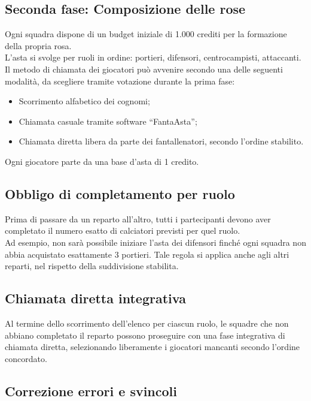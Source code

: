 \subsection{Seconda fase: Composizione delle rose}
\label{art:4.3.2}

Ogni squadra dispone di un budget iniziale di 1.000 crediti per la formazione della propria rosa.\\
L’asta si svolge per ruoli in ordine: portieri, difensori, centrocampisti, attaccanti.\\
Il metodo di chiamata dei giocatori può avvenire secondo una delle seguenti modalità, da scegliere tramite votazione durante la prima fase:
\begin{itemize}
  \item Scorrimento alfabetico dei cognomi;
  \item Chiamata casuale tramite software “FantaAsta”;
  \item Chiamata diretta libera da parte dei fantallenatori, secondo l’ordine stabilito.
\end{itemize}

\noindent
Ogni giocatore parte da una base d’asta di 1 credito.

\subsection{Obbligo di completamento per ruolo}
\label{art:4.3.3}

Prima di passare da un reparto all’altro, tutti i partecipanti devono aver completato il numero esatto di calciatori previsti per quel ruolo.\\
Ad esempio, non sarà possibile iniziare l’asta dei difensori finché ogni squadra non abbia acquistato esattamente 3 portieri. Tale regola si applica anche agli altri reparti, nel rispetto della suddivisione stabilita.

\subsection{Chiamata diretta integrativa}
\label{art:4.3.4}

Al termine dello scorrimento dell’elenco per ciascun ruolo, le squadre che non abbiano completato il reparto possono proseguire con una fase integrativa di chiamata diretta, selezionando liberamente i giocatori mancanti secondo l’ordine concordato.

\subsection{Correzione errori e svincoli}
\label{art:4.3.5}

